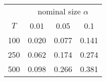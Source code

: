 % 
\begin{tabular}{cccc}
  \hline
  & \multicolumn{3}{c}{nominal size $\alpha$} \\
 $T$ & 0.01 & 0.05 & 0.1 \\
 \hline
100 & 0.020 & 0.077 & 0.141 \\ 
  250 & 0.062 & 0.174 & 0.274 \\ 
  500 & 0.098 & 0.266 & 0.381 \\ 
   \hline
\end{tabular}
